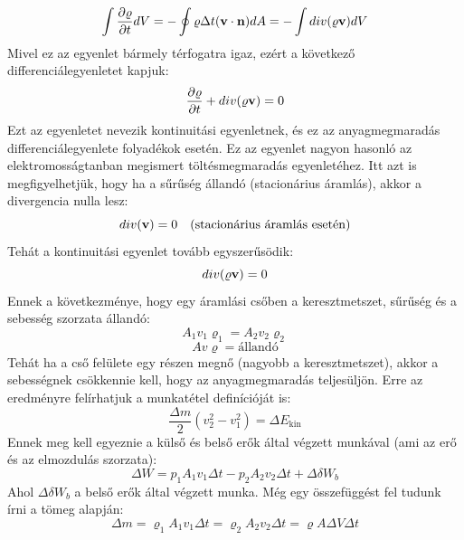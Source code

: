 \documentclass[a4paper,12pt]{article}
\begin{document}
\begin{equation}
    \int \frac{\partial \varrho}{\partial t} dV = - \oint \varrho \Delta t (\bold{v} \cdot \bold{n}) dA = - \int div(\varrho \bold{v}) dV
\end{equation}
Mivel ez az egyenlet bármely térfogatra igaz, ezért a következő differenciálegyenletet kapjuk:
\begin{equation}
    \frac{\partial \varrho}{\partial t} + div(\varrho \bold{v}) = 0
\end{equation}
Ezt az egyenletet nevezik kontinuitási egyenletnek, és ez az anyagmegmaradás differenciálegyenlete folyadékok esetén. Ez az egyenlet nagyon hasonló 
az elektromosságtanban megismert töltésmegmaradás egyenletéhez. Itt azt is megfigyelhetjük, hogy ha a sűrűség állandó (stacionárius áramlás), akkor a divergencia
nulla lesz:
\begin{equation}
    div(\bold{v}) = 0 \quad \text{(stacionárius áramlás esetén)}
\end{equation}
Tehát a kontinuitási egyenlet tovább egyszerűsödik:
\begin{equation}
    div(\varrho \bold{v}) = 0
\end{equation}
Ennek a következménye, hogy egy áramlási csőben a keresztmetszet, sűrűség és a sebesség szorzata állandó:
\begin{equation}
    A_1 v_1 \varrho_1 = A_2 v_2 \varrho_2
\end{equation}
\begin{equation}
    A v \varrho = \text{állandó}
\end{equation}
Tehát ha a cső felülete egy részen megnő (nagyobb a keresztmetszet), akkor a sebességnek csökkennie kell, hogy az anyagmegmaradás teljesüljön.
Erre az eredményre felírhatjuk a munkatétel definícióját is:
\begin{equation}
  \frac{\Delta m}{2} (v_2^2 - v_1^2) = \Delta E_{\text{kin}}
\end{equation}
Ennek meg kell egyeznie a külső és belső erők által végzett munkával (ami az erő és az elmozdulás szorzata):
\begin{equation}
   \Delta W = p_1 A_1 v_1 \Delta t - p_2 A_2 v_2 \Delta t + \Delta \delta W_b
\end{equation}
Ahol $\Delta \delta W_b$ a belső erők által végzett munka. Még egy összefüggést fel tudunk írni a tömeg alapján:
\begin{equation}
    \Delta m = \varrho_1 A_1 v_1 \Delta t = \varrho_2 A_2 v_2 \Delta t = \varrho A \Delta V \Delta t
\end{equation}
\end{document}
